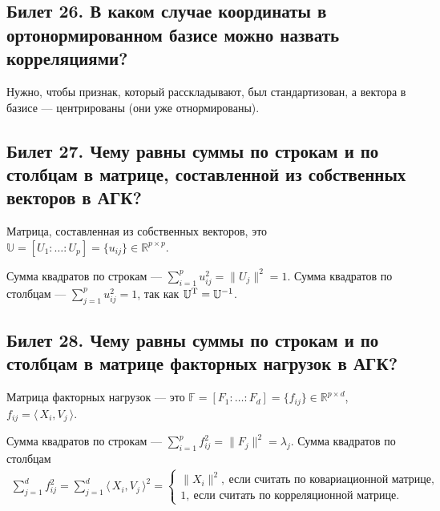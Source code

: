 \subsection{Билет 26. В каком случае координаты в ортонормированном базисе можно назвать корреляциями?}

Нужно, чтобы признак, который расскладывают, был стандартизован, а вектора в базисе --- центрированы (они уже отнормированы).


\subsection{Билет 27. Чему равны суммы по строкам и по столбцам в матрице, составленной из собственных векторов в АГК?}

Матрица, составленная из собственных векторов, это $\mathbb{U} = [U_1:\ldots:U_p] =\{u_{ij}\} \in \mathbb{R}^{p\times p}$.

Сумма квадратов по строкам --- $\sum_{i = 1}^p u_{ij}^2 = \|U_j\|^2 = 1$.
Сумма квадратов по столбцам --- $\sum_{j = 1}^p u_{ij}^2 = 1$, так как $\mathbb{U}^{\rm T} = \mathbb{U}^{-1}$.

\subsection{Билет 28. Чему равны суммы по строкам и по столбцам в матрице факторных нагрузок в АГК?}

Матрица факторных нагрузок --- это $\mathbb{F} = [F_1:\ldots:F_d] = \{f_{ij}\} \in \mathbb{R}^{p\times d}$, $f_{ij} = \langle\,X_i, V_j\,\rangle$.

Сумма квадратов по строкам --- $\sum_{i = 1}^p f_{ij}^2 = \|F_j\|^2 = \lambda_j$.
Сумма квадратов по столбцам
\begin{gather*}
\sum_{j = 1}^d f_{ij}^2 = \sum_{j = 1}^d \langle\,X_i, V_j\,\rangle^2 = 
\begin{cases}
 \|X_i\|^2,\ \text{если считать по ковариационной матрице},\\ 
1,\ \text{если считать по корреляционной матрице}.
\end{cases}
\end{gather*}
